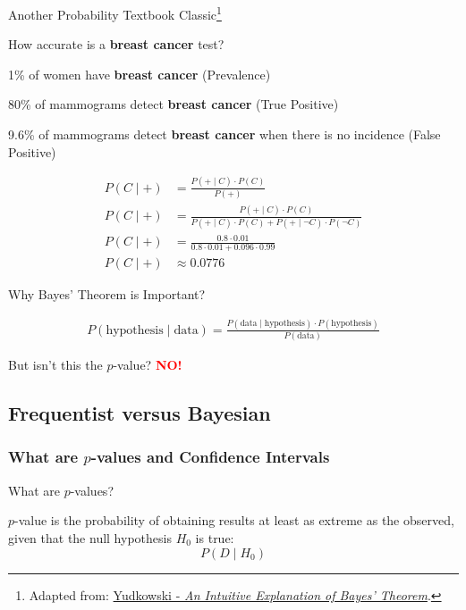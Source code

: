 \begin{frame}{Another Probability Textbook Classic\footnote{Adapted from: \href{https://www.yudkowsky.net/rational/bayes}{Yudkowski - \textit{An Intuitive Explanation of Bayes’ Theorem}}.
		}}
	\begin{example}
		\small
		How accurate is a \textbf{breast cancer} test?
		\begin{vfilleditems}
			\item \footnotesize 1\% of women have \textbf{breast cancer} (Prevalence)
			\item \footnotesize 80\% of mammograms detect \textbf{breast cancer} (True Positive)
			\item \footnotesize 9.6\% of mammograms detect \textbf{breast cancer} when there is no incidence (False Positive)
		\end{vfilleditems}
		$$
			\begin{aligned}
				P(C \mid +) & = \frac{P(+ \mid C) \cdot P(C)}{P(+)} \\ P(C \mid +) & = \frac{P(+ \mid C) \cdot P(C)}{P(+ \mid C) \cdot P(C) + P(+ \mid \neg C) \cdot P(\neg C)} \\ P(C \mid +) & = \frac{0.8 \cdot 0.01}{0.8 \cdot 0.01 + 0.096 \cdot 0.99} \\ P(C \mid +) & \approx 0.0776
			\end{aligned}
		$$
	\end{example}
\end{frame}

\begin{frame}{Why Bayes' Theorem is Important?
	}
	\begin{idea}
		$$
			\begin{aligned}
				P(\text{hypothesis} \mid \text{data}) = \frac{P(\text{data} \mid \text{hypothesis}) \cdot P(\text{hypothesis})}{P(\text{data})}
			\end{aligned}
		$$
	\end{idea}
	But isn't this the $p$-value?
	\textcolor{red}{\textbf{NO!}}
\end{frame}

\subsection{Frequentist versus Bayesian}
\subsubsection{What are $p$-values and Confidence Intervals}
\begin{frame}{What are $p$-values?}
	\begin{defn}[$p$-value]
		$p$-value is the probability of obtaining results at least as
		extreme as the observed,
		given that the null hypothesis $H_0$ is true:
		$$P(D \mid H_0)$$
	\end{defn}
\end{frame}

